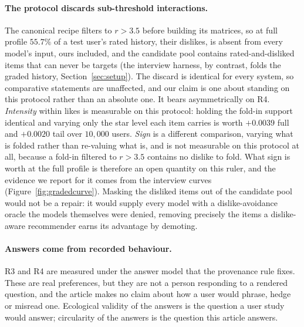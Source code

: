 \documentclass[manuscript,screen]{acmart}
\begin{document}
\paragraph{The protocol discards sub-threshold interactions.} The canonical recipe filters to $r>3.5$ before building its matrices, so at full profile $55.7\%$ of a test user's rated history, their dislikes, is absent from every model's input, ours included, and the candidate pool contains rated-and-disliked items that can never be targets (the interview harness, by contrast, folds the graded history, Section~\ref{sec:setup}). The discard is identical for every system, so comparative statements are unaffected, and our claim is one about standing on this protocol rather than an absolute one. It bears asymmetrically on R4. \emph{Intensity} within likes is measurable on this protocol: holding the fold-in support identical and varying only the star level each item carries is worth $+0.0039$ full and $+0.0020$ tail over $10{,}000$ users. \emph{Sign} is a different comparison, varying what is folded rather than re-valuing what is, and is not measurable on this protocol at all, because a fold-in filtered to $r>3.5$ contains no dislike to fold. What sign is worth at the full profile is therefore an open quantity on this ruler, and the evidence we report for it comes from the interview curves (Figure~\ref{fig:gradedcurve}). Masking the disliked items out of the candidate pool would not be a repair: it would supply every model with a dislike-avoidance oracle the models themselves were denied, removing precisely the items a dislike-aware recommender earns its advantage by demoting.

\paragraph{Answers come from recorded behaviour.} R3 and R4 are measured under the answer model that the provenance rule fixes. These are real preferences, but they are not a person responding to a rendered question, and the article makes no claim about how a user would phrase, hedge or misread one. Ecological validity of the answers is the question a user study would answer; circularity of the answers is the question this article answers.
\end{document}
